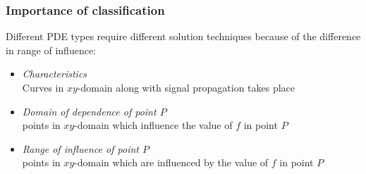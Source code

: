 \begin{frame}
\begin{columns}
{\begin{center}
      \end{center}
    }
  \end{columns}
  \vfill
\end{frame}

\begin{frame}
  \frametitle{Importance of classification}
  Different PDE types require different solution techniques because of the difference in range of influence:
  \begin{itemize}
     \item \emph{Characteristics} \\
    Curves in $xy$-domain along with signal propagation takes place
     \item \emph{Domain of dependence of point $P$} \\
    points in $xy$-domain which influence the value of $f$ in point $P$
     \item \emph{Range of influence of point $P$}\\
    points in $xy$-domain which are influenced by the value of $f$ in point $P$
  \end{itemize}
\end{frame}

